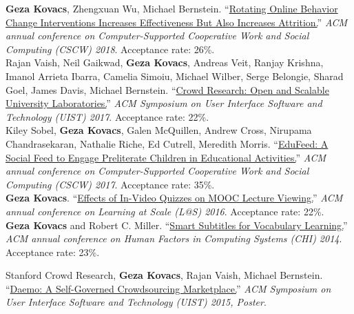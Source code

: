 
\textbf{Geza Kovacs}, {\small Zhengxuan Wu, Michael Bernstein.} ``\href{https://hci.stanford.edu/publications/2018/habitlab/habitlab-cscw18.pdf}{Rotating Online Behavior Change Interventions Increases Effectiveness But Also Increases Attrition.}'' \emph{ACM annual conference on Computer-Supported Cooperative Work and Social Computing (CSCW) 2018}. Acceptance rate: 26\%.\\

{\small Rajan Vaish, Neil Gaikwad,} \textbf{Geza Kovacs}, {\small Andreas Veit, Ranjay Krishna, Imanol Arrieta Ibarra, Camelia Simoiu, Michael Wilber, Serge Belongie, Sharad Goel, James Davis, Michael Bernstein.} ``\href{https://hci.stanford.edu/publications/2017/crowdresearch/crowd-research-uist2017.pdf}{Crowd Research: Open and Scalable University Laboratories.}'' \emph{ACM Symposium on User Interface Software and Technology (UIST) 2017}. Acceptance rate: 22\%.\\

{\small Kiley Sobel,} \textbf{Geza Kovacs}, {\small Galen McQuillen, Andrew Cross, Nirupama Chandrasekaran, Nathalie Riche, Ed Cutrell, Meredith Morris.} ``\href{https://www.microsoft.com/en-us/research/wp-content/uploads/2016/10/edufeed.pdf}{EduFeed: A Social Feed to Engage Preliterate Children in Educational Activities.}'' \emph{ACM annual conference on Computer-Supported Cooperative Work and Social Computing (CSCW) 2017}. Acceptance rate: 35\%.\\

\textbf{Geza Kovacs}. ``\href{https://hci.stanford.edu/publications/2016/invideo/invideo-las2016.pdf}{Effects of In-Video Quizzes on MOOC Lecture Viewing.}'' \emph{ACM annual conference on Learning at Scale (L@S) 2016}. Acceptance rate: 22\%.\\

\textbf{Geza Kovacs} {\small and Robert C. Miller.} ``\href{http://up.csail.mit.edu/other-pubs/chi2014-smartsubs.pdf}{Smart Subtitles for Vocabulary Learning.}'' \emph{ACM annual conference on Human Factors in Computing Systems (CHI) 2014}. Acceptance rate: 23\%.\\


{\small Stanford Crowd Research,} \textbf{Geza Kovacs}, {\small Rajan Vaish, Michael Bernstein.} ``\href{https://hci.stanford.edu/publications/2015/crowdresearch/daemo-uist.pdf}{Daemo: A Self-Governed Crowdsourcing Marketplace.}'' \emph{ACM Symposium on User Interface Software and Technology (UIST) 2015, Poster}.\\


